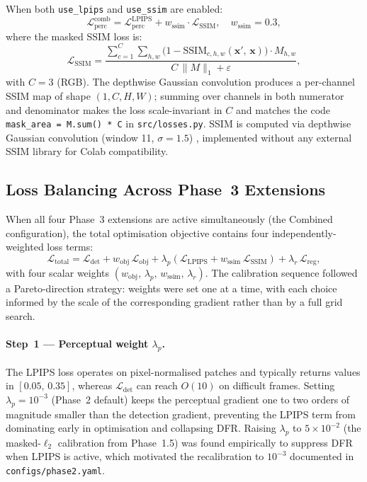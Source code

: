 \documentclass[12pt,a4paper]{report}
\newcommand{\Lperc}{\mathcal{L}_{\text{perc}}}
\begin{document}
When both \texttt{use\_lpips} and \texttt{use\_ssim} are enabled:
\begin{equation}
  \Lperc^{\text{comb}} = \Lperc^{\text{LPIPS}} + w_{\text{ssim}} \cdot \mathcal{L}_{\text{SSIM}},
  \quad w_{\text{ssim}} = 0.3,
\end{equation}
where the masked SSIM loss is:
\begin{equation}
  \mathcal{L}_{\text{SSIM}} =
    \frac{\displaystyle\sum_{c=1}^{C}\sum_{h,w}
      \bigl(1 - \mathrm{SSIM}_{c,h,w}(\mathbf{x}',\,\mathbf{x})\bigr) \cdot M_{h,w}}
         {C\,\|M\|_1 + \varepsilon},
\end{equation}
with $C{=}3$ (RGB). The depthwise Gaussian convolution produces a per-channel
SSIM map of shape $(1,C,H,W)$; summing over channels in both numerator and
denominator makes the loss scale-invariant in $C$ and matches the code
\texttt{mask\_area = M.sum() * C} in \texttt{src/losses.py}.
SSIM is computed via depthwise Gaussian convolution (window 11, $\sigma = 1.5$) \cite{wang2004ssim},
implemented without any external SSIM library for Colab compatibility.

\subsection{Loss Balancing Across Phase~3 Extensions}
\label{sec:loss_balancing}

When all four Phase~3 extensions are active simultaneously (the Combined
configuration), the total optimisation objective contains four
independently-weighted loss terms:
\begin{equation}
  \mathcal{L}_\text{total}
    = \mathcal{L}_\text{det}
    + w_\text{obj}\,\mathcal{L}_\text{obj}
    + \lambda_p\!\left(\mathcal{L}_\text{LPIPS} + w_\text{ssim}\,\mathcal{L}_\text{SSIM}\right)
    + \lambda_r\,\mathcal{L}_\text{reg},
  \label{eq:total_loss}
\end{equation}
with four scalar weights $(w_\text{obj},\,\lambda_p,\,w_\text{ssim},\,\lambda_r)$.
The calibration sequence followed a Pareto-direction strategy: weights were
set one at a time, with each choice informed by the scale of the
corresponding gradient rather than by a full grid search.

\paragraph{Step~1 — Perceptual weight $\lambda_p$.}
The LPIPS loss operates on pixel-normalised patches and typically returns
values in $[0.05,\,0.35]$, whereas $\mathcal{L}_\text{det}$ can reach
$O(10)$ on difficult frames.  Setting $\lambda_p = 10^{-3}$ (Phase~2
default) keeps the perceptual gradient one to two orders of magnitude
smaller than the detection gradient, preventing the LPIPS term from
dominating early in optimisation and collapsing DFR.  Raising $\lambda_p$
to $5 \times 10^{-2}$ (the masked-$\ell_2$ calibration from Phase~1.5) was
found empirically to suppress DFR when LPIPS is active, which motivated
the recalibration to $10^{-3}$ documented in
\texttt{configs/phase2.yaml}.
\end{document}
